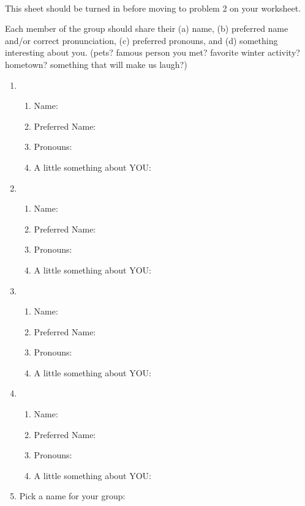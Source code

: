 \documentclass[11pt,fleqn]{article}
\begin{document}
\renewcommand{\headrulewidth}{0pt}
\newcommand{\blank}[1]{\rule{#1}{0.75pt}}
\newcommand{\bc}{\begin{center}}
\newcommand{\ec}{\end{center}}
\renewcommand{\d}{\displaystyle}

\vspace*{-0.7in}

\begin{center}
  \large
  \\
  
\end{center}

{\Large{This sheet should be turned in before moving to problem 2 on your worksheet.}}

Each member of the group should share their (a) name, (b) preferred name and/or correct pronunciation, (c) preferred pronouns, and (d) something interesting about you. (pets? famous person you met? favorite winter activity? hometown? something that will make us laugh?)\\

\begin{enumerate}
\item 
	\begin{enumerate}
	\item Name: 
	\item Preferred Name:
	\item Pronouns:
	\item A little something about YOU:
	\end{enumerate}
\vfill
\item 
	\begin{enumerate}
	\item Name: 
	\item Preferred Name:
	\item Pronouns:
	\item A little something about YOU:
	\end{enumerate}
\vfill
\item 
	\begin{enumerate}
	\item Name: 
	\item Preferred Name:
	\item Pronouns:
	\item A little something about YOU:
	\end{enumerate}
\vfill
\item 
	\begin{enumerate}
	\item Name: 
	\item Preferred Name:
	\item Pronouns:
	\item A little something about YOU:
	\end{enumerate}
\vfill
\item Pick a name for your group: 
\vspace{0.4in}
\end{enumerate}
\end{document}
